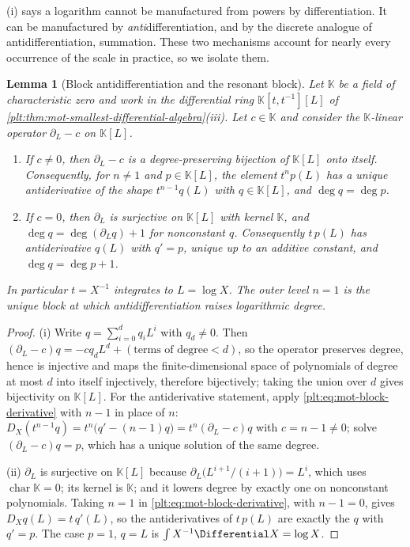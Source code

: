 \documentclass[11pt,oneside]{article}
\theoremstyle{plain}
\newtheorem{lemma}[theorem]{Lemma}
\theoremstyle{definition}
\theoremstyle{remark}
\newcommand{\K}{\mathbb{K}}
\newcommand{\DX}{D_{X}}                                  %
\begin{document}
(i) says a logarithm cannot be
manufactured from powers by differentiation.  It can be manufactured by
\emph{anti}differentiation, and by the discrete analogue of
antidifferentiation, summation.  These two mechanisms account for nearly every
occurrence of the scale in practice, so we isolate them.

\begin{lemma}[Block antidifferentiation and the resonant block]
\label{plt:lem:mot-block-antiderivative}
Let \(\K\) be a field of characteristic zero and work in the differential ring
\(\K[t,t^{-1}][L]\) of
\cref{plt:thm:mot-smallest-differential-algebra}(iii).  Let \(c\in\K\) and
consider the \(\K\)-linear operator \(\partial_{L}-c\) on \(\K[L]\).
\begin{enumerate}
\item If \(c\ne0\), then \(\partial_{L}-c\) is a degree-preserving bijection of
  \(\K[L]\) onto itself.  Consequently, for \(n\ne1\) and \(p\in\K[L]\), the
  element \(t^{n}p(L)\) has a unique antiderivative of the shape
  \(t^{n-1}q(L)\) with \(q\in\K[L]\), and \(\deg q=\deg p\).
\item If \(c=0\), then \(\partial_{L}\) is surjective on \(\K[L]\) with kernel
  \(\K\), and \(\deg q=\deg(\partial_{L}q)+1\) for nonconstant \(q\).
  Consequently \(t\,p(L)\) has antiderivative \(q(L)\) with \(q'=p\), unique up
  to an additive constant, and \(\deg q=\deg p+1\).
\end{enumerate}
In particular \(t=X^{-1}\) integrates to \(L=\log X\).  The outer level
\(n=1\) is the unique block at which antidifferentiation raises logarithmic
degree.
\end{lemma}

\begin{proof}
(i) Write \(q=\sum_{i=0}^{d}q_{i}L^{i}\) with \(q_{d}\ne0\).  Then
\((\partial_{L}-c)q=-cq_{d}L^{d}+(\text{terms of degree}<d)\), so the operator
preserves degree, hence is injective and maps the finite-dimensional space of
polynomials of degree at most \(d\) into itself injectively, therefore
bijectively; taking the union over \(d\) gives bijectivity on \(\K[L]\).  For
the antiderivative statement, apply \eqref{plt:eq:mot-block-derivative} with
\(n-1\) in place of \(n\):
\(\DX(t^{n-1}q)=t^{n}\bigl(q'-(n-1)q\bigr)=t^{n}(\partial_{L}-c)q\) with
\(c=n-1\ne0\); solve \((\partial_{L}-c)q=p\), which has a unique solution of
the same degree.

(ii) \(\partial_{L}\) is surjective on \(\K[L]\) because
\(\partial_{L}\bigl(L^{i+1}/(i+1)\bigr)=L^{i}\), which uses
\(\operatorname{char}\K=0\); its kernel is \(\K\); and it lowers degree by
exactly one on nonconstant polynomials.  Taking \(n=1\) in
\eqref{plt:eq:mot-block-derivative}, with \(n-1=0\), gives
\(\DX q(L)=t\,q'(L)\), so the antiderivatives of \(t\,p(L)\) are exactly the
\(q\) with \(q'=p\).  The case \(p=1\), \(q=L\) is
\(\int X^{-1}\Differential X=\log X\).
\end{proof}
\end{document}
